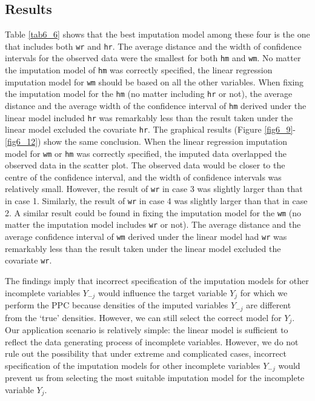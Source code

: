 \documentclass[12pt, fullpage, a4paper]{article}
\begin{document}
\subsection{Results}
Table \ref{tab6_6} shows that the best imputation model among these four is the one that includes both \texttt{wr} and \texttt{hr}. The average distance and the width of confidence intervals for the observed data were the smallest for both \texttt{hm} and \texttt{wm}. No matter the imputation model of \texttt{hm} was correctly specified, the linear regression imputation model for \texttt{wm} should be based on all the other variables. When fixing the imputation model for the \texttt{hm} (no matter including \texttt{hr} or not), the average distance and the average width of the confidence interval of \texttt{hm} derived under the linear model included \texttt{hr} was remarkably less than the result taken under the linear model excluded the covariate \texttt{hr}. The graphical results (Figure \ref{fig6_9}-\ref{fig6_12}) show the same conclusion. When the linear regression imputation model for \texttt{wm} or \texttt{hm} was correctly specified, the imputed data overlapped the observed data in the scatter plot. The observed data would be closer to the centre of the confidence interval, and the width of confidence intervals was relatively small. However, the result of \texttt{wr} in case 3 was slightly larger than that in case 1. Similarly, the result of \texttt{wr} in case 4 was slightly larger than that in case 2. A similar result could be found in fixing the imputation model for the \texttt{wm} (no matter the imputation model includes \texttt{wr} or not). The average distance and the average confidence interval of \texttt{wm} derived under the linear model had \texttt{wr} was remarkably less than the result taken under the linear model excluded the covariate \texttt{wr}.

The findings imply that incorrect specification of the imputation models for other incomplete variables $Y_{-j}$ would influence the target variable $Y_j$ for which we perform the PPC because densities of the imputed variables $Y_{-j}$ are different from the `true' densities. However, we can still select the correct model for $Y_j$. Our application scenario is relatively simple: the linear model is sufficient to reflect the data generating process of incomplete variables. However, we do not rule out the possibility that under extreme and complicated cases, incorrect specification of the imputation models for other incomplete variables $Y_{-j}$ would prevent us from selecting the most suitable imputation model for the incomplete variable $Y_j$. 
\end{document}
